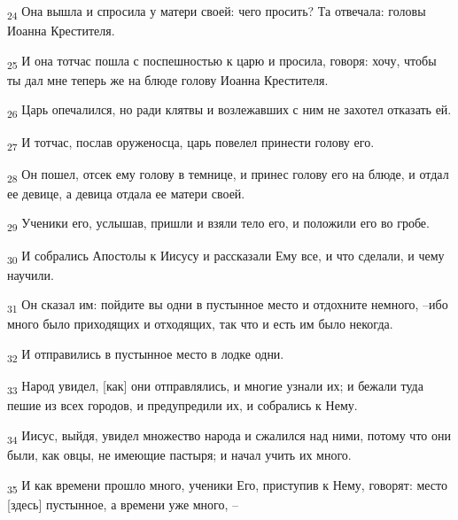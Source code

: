 \begin{tcolorbox}
\textsubscript{24} Она вышла и спросила у матери своей: чего просить? Та отвечала: головы Иоанна Крестителя.
\end{tcolorbox}
\begin{tcolorbox}
\textsubscript{25} И она тотчас пошла с поспешностью к царю и просила, говоря: хочу, чтобы ты дал мне теперь же на блюде голову Иоанна Крестителя.
\end{tcolorbox}
\begin{tcolorbox}
\textsubscript{26} Царь опечалился, но ради клятвы и возлежавших с ним не захотел отказать ей.
\end{tcolorbox}
\begin{tcolorbox}
\textsubscript{27} И тотчас, послав оруженосца, царь повелел принести голову его.
\end{tcolorbox}
\begin{tcolorbox}
\textsubscript{28} Он пошел, отсек ему голову в темнице, и принес голову его на блюде, и отдал ее девице, а девица отдала ее матери своей.
\end{tcolorbox}
\begin{tcolorbox}
\textsubscript{29} Ученики его, услышав, пришли и взяли тело его, и положили его во гробе.
\end{tcolorbox}
\begin{tcolorbox}
\textsubscript{30} И собрались Апостолы к Иисусу и рассказали Ему все, и что сделали, и чему научили.
\end{tcolorbox}
\begin{tcolorbox}
\textsubscript{31} Он сказал им: пойдите вы одни в пустынное место и отдохните немного, --ибо много было приходящих и отходящих, так что и есть им было некогда.
\end{tcolorbox}
\begin{tcolorbox}
\textsubscript{32} И отправились в пустынное место в лодке одни.
\end{tcolorbox}
\begin{tcolorbox}
\textsubscript{33} Народ увидел, [как] они отправлялись, и многие узнали их; и бежали туда пешие из всех городов, и предупредили их, и собрались к Нему.
\end{tcolorbox}
\begin{tcolorbox}
\textsubscript{34} Иисус, выйдя, увидел множество народа и сжалился над ними, потому что они были, как овцы, не имеющие пастыря; и начал учить их много.
\end{tcolorbox}
\begin{tcolorbox}
\textsubscript{35} И как времени прошло много, ученики Его, приступив к Нему, говорят: место [здесь] пустынное, а времени уже много, --
\end{tcolorbox}
